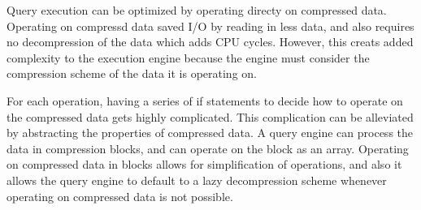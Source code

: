 Query execution can be optimized by operating directy on compressed data. Operating on compressd data saved I/O by reading in less data, and also requires no decompression of the data which adds CPU cycles. However, this creats added complexity to the execution engine because the engine must consider the compression scheme of the data it is operating on. 


For each operation, having a series of if statements to decide how to operate on the compressed data gets highly complicated. This complication can be alleviated by abstracting the properties of compressed data. A query engine can process the data in compression blocks, and can operate on the block as an array\cite{compression}. Operating on compressed data in blocks allows for simplification of operations, and also it allows the query engine to default to a lazy decompression scheme whenever operating on compressed data is not possible.